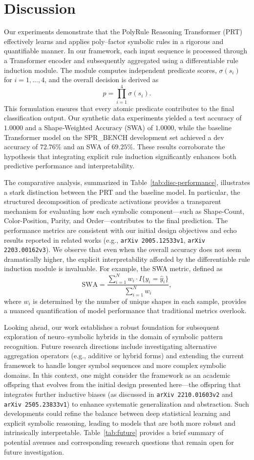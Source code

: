 \documentclass{article}
\begin{document}
\section{Discussion}
Our experiments demonstrate that the PolyRule Reasoning Transformer (PRT) effectively learns and applies poly–factor symbolic rules in a rigorous and quantifiable manner. In our framework, each input sequence is processed through a Transformer encoder and subsequently aggregated using a differentiable rule induction module. The module computes independent predicate scores, \( \sigma(s_i) \) for \( i = 1,\dots,4 \), and the overall decision is derived as 
\[
p = \prod_{i=1}^{4} \sigma(s_i).
\]
This formulation ensures that every atomic predicate contributes to the final classification output. Our synthetic data experiments yielded a test accuracy of \(1.0000\) and a Shape‐Weighted Accuracy (SWA) of \(1.0000\), while the baseline Transformer model on the SPR\_BENCH development set achieved a dev accuracy of \(72.76\%\) and an SWA of \(69.25\%\). These results corroborate the hypothesis that integrating explicit rule induction significantly enhances both predictive performance and interpretability.

The comparative analysis, summarized in Table~\ref{tab:disc-performance}, illustrates a stark distinction between the PRT and the baseline model. In particular, the structured decomposition of predicate activations provides a transparent mechanism for evaluating how each symbolic component—such as Shape-Count, Color-Position, Parity, and Order—contributes to the final prediction. The performance metrics are consistent with our initial design objectives and echo results reported in related works (e.g., \texttt{arXiv 2005.12533v1}, \texttt{arXiv 2203.00162v3}). We observe that even when the overall accuracy does not seem dramatically higher, the explicit interpretability afforded by the differentiable rule induction module is invaluable. For example, the SWA metric, defined as 
\[
\text{SWA} = \frac{\sum_{i=1}^{N} w_i \cdot I\{y_i = \hat{y}_i\}}{\sum_{i=1}^{N} w_i},
\]
where \(w_i\) is determined by the number of unique shapes in each sample, provides a nuanced quantification of model performance that traditional metrics overlook.

Looking ahead, our work establishes a robust foundation for subsequent exploration of neuro–symbolic hybrids in the domain of symbolic pattern recognition. Future research directions include investigating alternative aggregation operators (e.g., additive or hybrid forms) and extending the current framework to handle longer symbol sequences and more complex symbolic domains. In this context, one might consider the framework as an academic offspring that evolves from the initial design presented here—the offspring that integrates further inductive biases (as discussed in \texttt{arXiv 2210.01603v2} and \texttt{arXiv 2505.23833v1}) to enhance systematic generalization and abstraction. Such developments could refine the balance between deep statistical learning and explicit symbolic reasoning, leading to models that are both more robust and intrinsically interpretable. Table~\ref{tab:future} provides a brief summary of potential avenues and corresponding research questions that remain open for future investigation.
\end{document}
